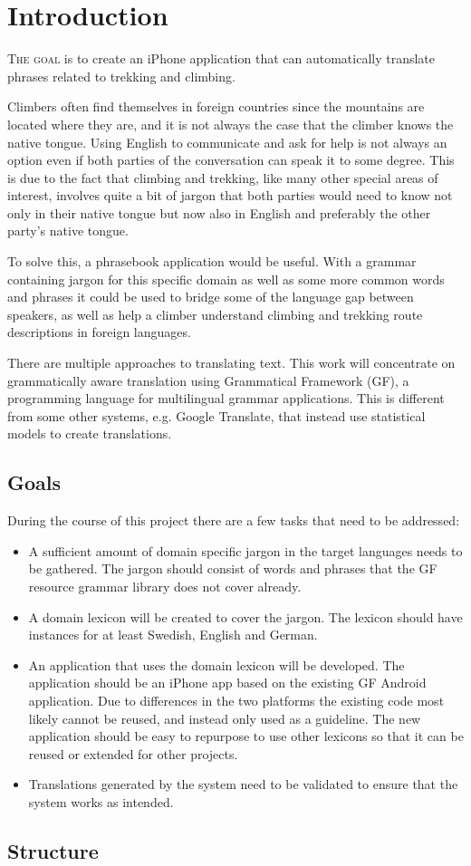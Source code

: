 \chapter{Introduction}
\lettrine[lines=4, loversize=-0.1, lraise=0.1]{T}{he goal} is to create an iPhone application that can automatically translate phrases related to trekking and climbing.

Climbers often find themselves in foreign countries since the mountains are located where they are, and it is not always the case that the climber knows the native tongue. Using English to communicate and ask for help is not always an option even if both parties of the conversation can speak it to some degree. This is due to the fact that climbing and trekking, like many other special areas of interest, involves quite a bit of jargon that both parties would need to know not only in their native tongue but now also in English and preferably the other party's native tongue.

To solve this, a phrasebook application would be useful. With a grammar containing jargon for this specific domain as well as some more common words and phrases it could be used to bridge some of the language gap between speakers, as well as help a climber understand climbing and trekking route descriptions in foreign languages.

There are multiple approaches to translating text. This work will concentrate on grammatically aware translation using Grammatical Framework (GF), a programming language for multilingual grammar applications. This is different from some other systems, e.g. Google Translate, that instead use statistical models to create translations.

\section{Goals}
During the course of this project there are a few tasks that need to be addressed:
\begin{itemize}
\item A sufficient amount of domain specific jargon in the target languages needs to be gathered. The jargon should consist of words and phrases that the GF resource grammar library does not cover already.
\item A domain lexicon will be created to cover the jargon. The lexicon should have instances for at least Swedish, English and German.
\item An application that uses the domain lexicon will be developed. The application should be an iPhone app based on the existing GF Android application. Due to differences in the two platforms the existing code most likely cannot be reused, and instead only used as a guideline. The new application should be easy to repurpose to use other lexicons so that it can be reused or extended for other projects.
\item Translations generated by the system need to be validated to ensure that the system works as intended.
\end{itemize}

\section{Structure}
